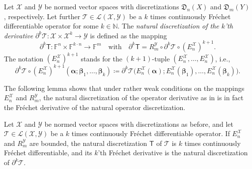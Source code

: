 \documentclass[a4paper]{paper}
\newcommand*{\SPC}[1]{{\ensuremath{\mathscr{#1}}}}
\newcommand*{\SPCL}{\SPC{L}}
\newcommand*{\SPCX}{\SPC{X}}
\newcommand*{\SPCY}{\SPC{Y}}
\newcommand*{\BLINOP}[2]{{\SPCL(#1, #2)}}
\newcommand{\FIELD}{{\ensuremath{\mathbb{F}}}}
\newcommand*{\Fn}{{\ensuremath{\FIELD^n}}}
\newcommand*{\Fm}{{\ensuremath{\FIELD^m}}}
\newcommand{\Natural}{\mathbb{N}}
\newcommand*{\OP}[1]{{\ensuremath{\mathcal{#1}}}}
\newcommand*{\OPT}{\OP{T}}
\newcommand{\DISCOP}[1]{{\ensuremath{\mathsf{#1}}}}
\newcommand*{\DISCOPT}{\DISCOP{T}}
\newcommand*{\EXT}[2]{\ensuremath{E_{#1}^{#2}}}
\newcommand*{\REST}[2]{\ensuremath{R_{#1}^{#2}}}
\newcommand*{\RmY}{{\ensuremath{\REST{m}{\SPC{Y}}}}}
\newcommand*{\EnX}{{\ensuremath{\EXT{n}{\SPC{X}}}}}
\newcommand*{\DISCR}[2]{{\ensuremath{\mathfrak{D}_{#2}(#1)}}}
\newcommand*{\DISCRnX}{\DISCR{X}{n}}
\newcommand*{\DISCRmY}{\DISCR{Y}{m}}
\newcommand{\valpha}{\boldsymbol{\alpha}}
\newcommand{\vbeta}{\boldsymbol{\beta}}
\begin{document}
\begin{definition}
 \label{def:discr:operator:op_deriv:operator_deriv_discr}
 Let $\SPCX$ and $\SPCY$ be normed vector spaces with discretizations $\DISCRnX$ and $\DISCRmY$, 
 respectively. Let further $\OPT \in \BLINOP{\SPCX}{\SPCY}$ be a $k$ times continuously Fr\'{e}chet 
 differentiable operator for some $k \in  \Natural$. The \emph{natural discretization of the $k$'th derivative} 
 $\partial^k \OPT \colon \SPCX \times \SPCX^k \to \SPCY$ is defined as the mapping
 \begin{equation*}
  \partial^k \DISCOPT \colon \Fn \times \FIELD^{k\cdot n} \to \Fm
  \quad \text{with} \quad
  \partial^k \DISCOPT = \RmY \circ \partial^k \OPT \circ (\EnX)^{k+1}.
 \end{equation*}
 The notation $(\EnX)^{k+1}$ stands for the $(k+1)$-tuple $(\EnX, \dotsc, \EnX)$, i.e., 
 \begin{equation*}
  \partial^k \OPT \circ (\EnX)^{k+1}(\valpha; \vbeta_1, \dotsc, \vbeta_k) \coloneqq 
 \partial^k \OPT\big( \EnX(\valpha); \EnX(\vbeta_1), \dotsc, \EnX(\vbeta_k) \big).
 \end{equation*}
\end{definition}


The following lemma shows that under rather weak conditions on the mappings $E_n^{\SPCX}$ and $R_m^{\SPCY}$, the 
natural discretization of the operator derivative as in  is in 
fact the Fr\'{e}chet derivative of the natural operator discretization.


\begin{lemma}
 \label{lemma:discr:operator:op_deriv:natural_is_deriv}
 Let $\SPCX$ and $\SPCY$ be normed vector spaces with discretizations as before, and let 
 $\OPT \in \BLINOP{\SPCX}{\SPCY}$ be a $k$ times continuously Fr\'{e}chet differentiable 
 operator. If $E_n^{\SPCX}$ and $R_m^{\SPCY}$ are bounded, the natural discretization $\DISCOPT$ of $\OPT$ is 
 $k$ times  continuously Fr\'{e}chet differentiable, and its $k$'th Fr\'{e}chet derivative is the natural 
 discretization of $\partial^k\OPT$.
\end{lemma}
\vspace{1em}
\end{document}

